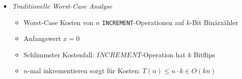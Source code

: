 \documentclass[
    12pt,
    a4paper,
    ngerman,
    color=3b,%
    marginpar=false,
    colorback=false,
    leqno,
]{tudaexercise}
\begin{document}
\begin{itemize}
\begin{itemize}
\begin{itemize}
                    \end{itemize}
                \item \textit{Traditionelle Worst-Case Analyse}
                    \begin{itemize}
                        \item Worst-Case Kosten von $n$ \texttt{INCREMENT}-Operationen auf $k$-Bit Binärzähler
                        \item Anfangswert $x = 0$
                        \item Schlimmster Kostenfall: $INCREMENT$-Operation hat $k$ Bitflips
                        \item $n$-mal inkrementieren sorgt für Kosten: $T(n) \leq n \cdot k \in O(kn)$
                    \end{itemize}
            \end{itemize}

\pagebreak


\end{itemize}
\end{document}
